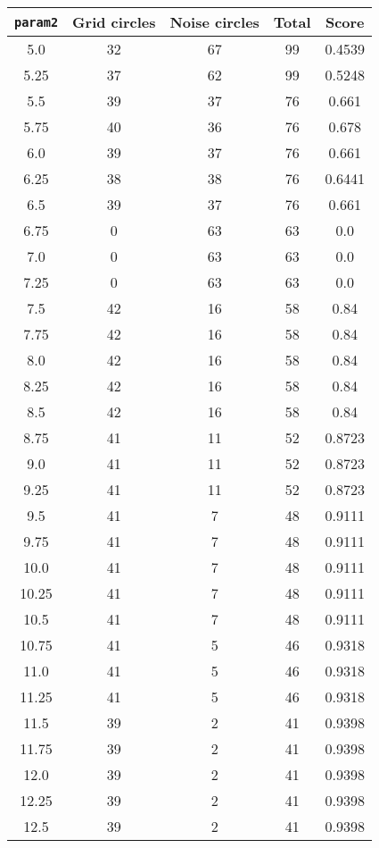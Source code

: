 \documentclass[letterpaper, 12pt]{article}
\begin{document}
\begin{longtable}{|c|c|c|c|c|}
\hline
\textbf{\texttt{param2}} & \textbf{Grid circles} & \textbf{Noise circles} & \textbf{Total} & \textbf{Score} \\
\hline
5.0 & 32 & 67 & 99 & 0.4539 \\
\hline
5.25 & 37 & 62 & 99 & 0.5248 \\
\hline
5.5 & 39 & 37 & 76 & 0.661 \\
\hline
5.75 & 40 & 36 & 76 & 0.678 \\
\hline
6.0 & 39 & 37 & 76 & 0.661 \\
\hline
6.25 & 38 & 38 & 76 & 0.6441 \\
\hline
6.5 & 39 & 37 & 76 & 0.661 \\
\hline
6.75 & 0 & 63 & 63 & 0.0 \\
\hline
7.0 & 0 & 63 & 63 & 0.0 \\
\hline
7.25 & 0 & 63 & 63 & 0.0 \\
\hline
7.5 & 42 & 16 & 58 & 0.84 \\
\hline
7.75 & 42 & 16 & 58 & 0.84 \\
\hline
8.0 & 42 & 16 & 58 & 0.84 \\
\hline
8.25 & 42 & 16 & 58 & 0.84 \\
\hline
8.5 & 42 & 16 & 58 & 0.84 \\
\hline
8.75 & 41 & 11 & 52 & 0.8723 \\
\hline
9.0 & 41 & 11 & 52 & 0.8723 \\
\hline
9.25 & 41 & 11 & 52 & 0.8723 \\
\hline
9.5 & 41 & 7 & 48 & 0.9111 \\
\hline
9.75 & 41 & 7 & 48 & 0.9111 \\
\hline
10.0 & 41 & 7 & 48 & 0.9111 \\
\hline
10.25 & 41 & 7 & 48 & 0.9111 \\
\hline
10.5 & 41 & 7 & 48 & 0.9111 \\
\hline
10.75 & 41 & 5 & 46 & 0.9318 \\
\hline
11.0 & 41 & 5 & 46 & 0.9318 \\
\hline
11.25 & 41 & 5 & 46 & 0.9318 \\
\hline
11.5 & 39 & 2 & 41 & 0.9398 \\
\hline
11.75 & 39 & 2 & 41 & 0.9398 \\
\hline
12.0 & 39 & 2 & 41 & 0.9398 \\
\hline
12.25 & 39 & 2 & 41 & 0.9398 \\
\hline
12.5 & 39 & 2 & 41 & 0.9398 \\

\end{longtable}
\end{document}
